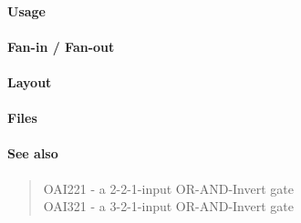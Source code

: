 \paragraph{Usage}

\paragraph{Fan-in / Fan-out}

\paragraph{Layout}

\paragraph{Files}

\paragraph{See also}
\begin{quote}
    OAI221 - a 2-2-1-input OR-AND-Invert gate \\
    OAI321 - a 3-2-1-input OR-AND-Invert gate
\end{quote}
